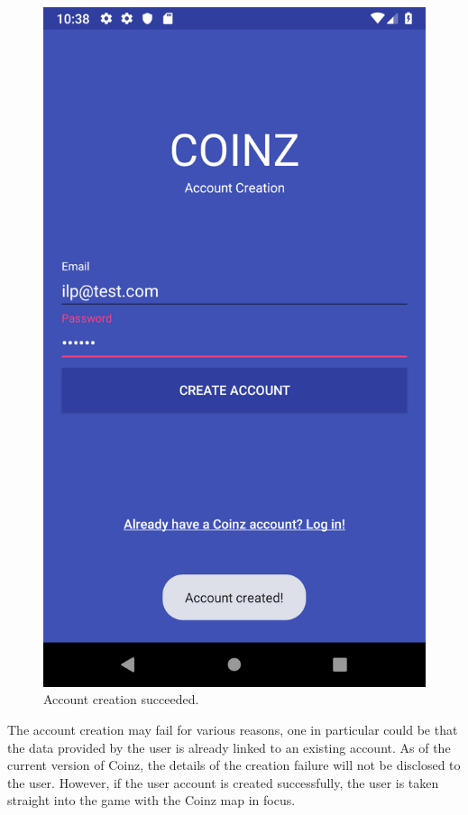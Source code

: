 \documentclass[11pt,a4paper,notitlepage]{article}
\begin{document}
\begin{figure}[H]
\begin{minipage}{0.48\textwidth}
        \includegraphics[scale=0.2]{screenshots/account-creation/account-creation-succeeded.png}
        \caption{Account creation succeeded.}
    \end{minipage}
\end{figure}

    The account creation may fail for various reasons, one in particular could be that the data provided by the user is already linked to an existing account. As of the current version of Coinz, the details of the creation failure will not be disclosed to the user. However, if the user account is created successfully, the user is taken straight into the game with the Coinz map in focus.
\end{document}
